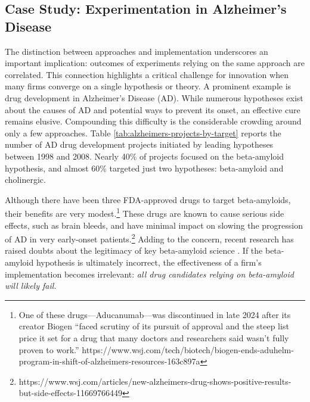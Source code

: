 \subsection{Case Study: Experimentation in Alzheimer's Disease}

The distinction between approaches and implementation underscores an important implication: outcomes of experiments relying on the same approach are correlated. This connection highlights a critical challenge for innovation when many firms converge on a single hypothesis or theory. A prominent example is drug development in Alzheimer’s Disease (AD). While numerous hypotheses exist about the causes of AD and potential ways to prevent its onset, an effective cure remains elusive. Compounding this difficulty is the considerable crowding around only a few approaches. Table \ref{tab:alzheimers-projects-by-target} reports the number of AD drug development projects initiated by leading hypotheses between 1998 and 2008. Nearly 40\% of projects focused on the beta-amyloid hypothesis, and almost 60\% targeted just two hypotheses: beta-amyloid and cholinergic.

Although there have been three FDA-approved drugs to target beta-amyloids, their benefits are very modest.\footnote{One of these drugs---Aducanumab---was discontinued in late 2024 after its creator Biogen ``faced scrutiny of its pursuit of approval and the steep list price it set for a drug that many doctors and researchers said wasn’t fully proven to work.'' https://www.wsj.com/tech/biotech/biogen-ends-aduhelm-program-in-shift-of-alzheimers-resources-163c897a} These drugs are known to cause serious side effects, such as brain bleeds, and have minimal impact on slowing the progression of AD in very early-onset patients.\footnote{https://www.wsj.com/articles/new-alzheimers-drug-shows-positive-results-but-side-effects-11669766449} Adding to the concern, recent research has raised doubts about the legitimacy of key beta-amyloid science \citep{piller2024researchers, piller2022blots}. If the beta-amyloid hypothesis is ultimately incorrect, the effectiveness of a firm's implementation becomes irrelevant: \emph{all drug candidates relying on beta-amyloid will likely fail.}

